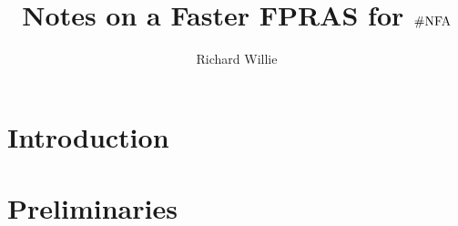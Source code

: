 \documentclass[11pt,twoside=off,numbers=noenddot]{scrbook}
\title{Notes on a Faster FPRAS for $\text{\#NFA}$}
\author{Richard Willie}
\begin{document}
\maketitle

\tableofcontents

\newpage

\chapter{Introduction}

\chapter{Preliminaries}

\printbibliography[nottype=image]
\end{document}
